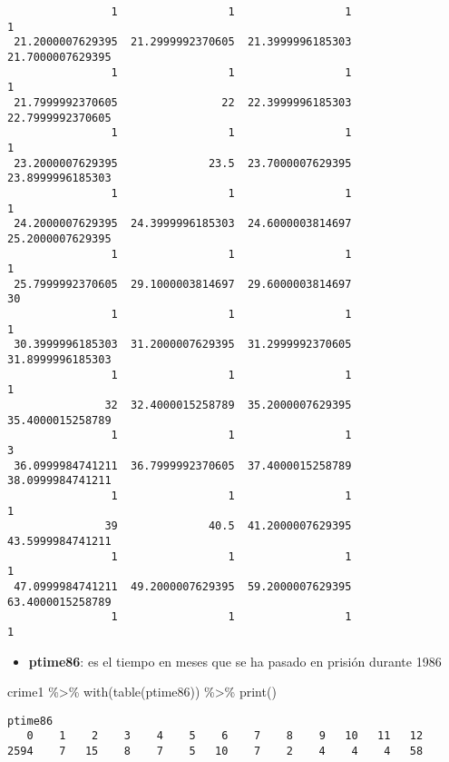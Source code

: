 \documentclass[
  letterpaper,
  DIV=11,
  numbers=noendperiod]{scrreprt}
\newenvironment{Shaded}{\begin{snugshade}}{\end{snugshade}}
\newcommand{\FunctionTok}[1]{\textcolor[rgb]{0.28,0.35,0.67}{#1}}
\newcommand{\NormalTok}[1]{\textcolor[rgb]{0.00,0.23,0.31}{#1}}
\newcommand{\SpecialCharTok}[1]{\textcolor[rgb]{0.37,0.37,0.37}{#1}}
\providecommand{\tightlist}{%
  \setlength{\itemsep}{0pt}\setlength{\parskip}{0pt}}\usepackage{longtable,booktabs,array}
\begin{document}
\begin{verbatim}
                1                 1                 1                 1 
 21.2000007629395  21.2999992370605  21.3999996185303  21.7000007629395 
                1                 1                 1                 1 
 21.7999992370605                22  22.3999996185303  22.7999992370605 
                1                 1                 1                 1 
 23.2000007629395              23.5  23.7000007629395  23.8999996185303 
                1                 1                 1                 1 
 24.2000007629395  24.3999996185303  24.6000003814697  25.2000007629395 
                1                 1                 1                 1 
 25.7999992370605  29.1000003814697  29.6000003814697                30 
                1                 1                 1                 1 
 30.3999996185303  31.2000007629395  31.2999992370605  31.8999996185303 
                1                 1                 1                 1 
               32  32.4000015258789  35.2000007629395  35.4000015258789 
                1                 1                 1                 3 
 36.0999984741211  36.7999992370605  37.4000015258789  38.0999984741211 
                1                 1                 1                 1 
               39              40.5  41.2000007629395  43.5999984741211 
                1                 1                 1                 1 
 47.0999984741211  49.2000007629395  59.2000007629395  63.4000015258789 
                1                 1                 1                 1 
\end{verbatim}

\begin{itemize}
\tightlist
\item
  \textbf{ptime86}: es el tiempo en meses que se ha pasado en prisión
  durante 1986
\end{itemize}

\begin{Shaded}
\begin{Highlighting}[]
\NormalTok{crime1 }\SpecialCharTok{\%\textgreater{}\%} 
  \FunctionTok{with}\NormalTok{(}\FunctionTok{table}\NormalTok{(ptime86)) }\SpecialCharTok{\%\textgreater{}\%} 
  \FunctionTok{print}\NormalTok{()}
\end{Highlighting}
\end{Shaded}

\begin{verbatim}
ptime86
   0    1    2    3    4    5    6    7    8    9   10   11   12 
2594    7   15    8    7    5   10    7    2    4    4    4   58 
\end{verbatim}
\end{document}
